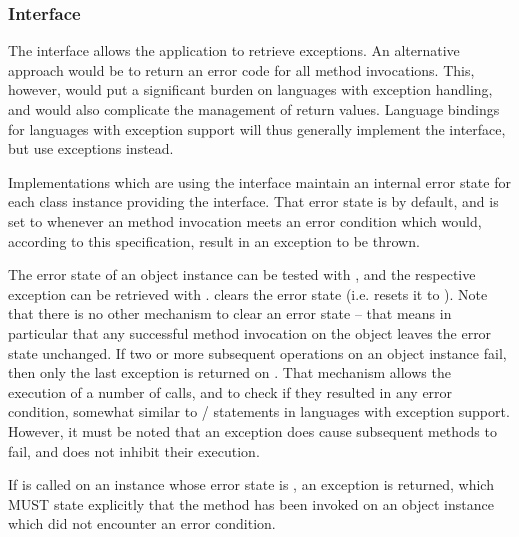  
 \newpage
 
 \subsubsection*{Interface }
 
 The  interface allows the application
 to retrieve exceptions.  An alternative approach would be to
 return an error code for all method invocations.  This,
 however, would put a significant burden on languages with
 exception handling, and would also complicate the management of
 return values.  Language bindings for languages with exception
 support will thus generally  implement the
  interface, but use exceptions instead.
 
 Implementations which are using the interface maintain
 an internal error state for each class instance providing the
 interface.  That error state is  by default, and is
 set to  whenever an method invocation meets an error
 condition which would, according to this specification, result
 in an exception to be thrown.
 
 The error state of an object instance can be tested with
 , and the respective exception can be retrieved
 with .   clears the error state (i.e.  resets it
 to ).  Note that there is no other mechanism to clear
 an error state -- that means in particular that any successful
 method invocation on the object leaves the error state
 unchanged.  If two or more subsequent operations on an object
 instance fail, then only the last exception is returned on
 .  That mechanism allows the execution of a
 number of calls, and to check if they resulted in any error
 condition, somewhat similar to / statements in
 languages with exception support.  However, it must be noted
 that an exception does  cause subsequent methods to
 fail, and does not inhibit their execution. 
 
 If  is called on an instance whose error
 state is , an  exception is
 returned, which MUST state explicitly that the
  method has been invoked on an object instance
 which did not encounter an error condition.
 

